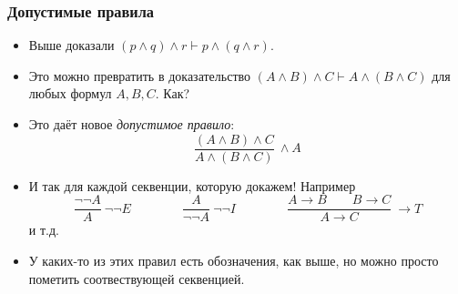 \documentclass[10pt]{beamer}
\begin{document}
\begin{frame}
    \frametitle{Допустимые правила}
    \begin{itemize}
        \item Выше доказали $(p \land q) \land r \vdash p \land (q \land r)$.
        \item Это можно превратить в доказательство $(A \land B) \land C \vdash A \land (B \land C)$ для любых формул $A,B,C$. Как? \pause
        \item Это даёт новое \emph{допустимое правило}:
        \[
            \frac{(A \land B) \land C}{A \land (B \land C)}\ \wedge A
        \]
        \item И так для каждой секвенции, которую докажем! Например
        \[
            \frac{\neg \neg A}{A}\ \neg \neg E \qquad \qquad \frac{A}{\neg \neg A}\ \neg \neg I \qquad \qquad \frac{A \to B \qquad B \to C}{A \to C}\ \to T
        \]
        и т.д.
        \item У каких-то из этих правил есть обозначения, как выше, но можно просто пометить соотвествующей секвенцией.
    \end{itemize}
\end{frame}
\end{document}
